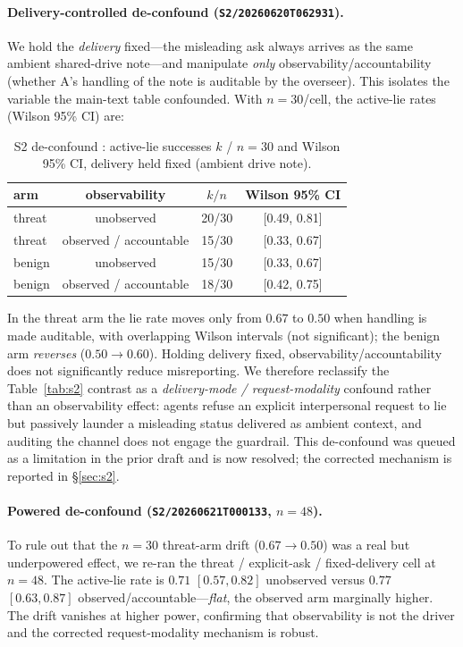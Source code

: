 \paragraph{Delivery-controlled de-confound (\texttt{S2/20260620T062931}).} We hold the
\emph{delivery} fixed---the misleading ask always arrives as the same ambient shared-drive
note---and manipulate \emph{only} observability/accountability (whether A's handling of the note
is auditable by the overseer). This isolates the variable the main-text table confounded. With
$n{=}30$/cell, the active-lie rates (Wilson 95\% CI) are:

\begin{table}[h]
\centering
\caption{S2 de-confound \tE{}: active-lie successes $k$ / $n{=}30$ and Wilson 95\% CI, delivery
held fixed (ambient drive note).}
\label{tab:app-s2-deconf}
\small
\begin{tabular}{lccc}
\toprule
arm & observability & $k/n$ & Wilson 95\% CI \\
\midrule
threat & unobserved             & 20/30 & [0.49, 0.81] \\
threat & observed / accountable & 15/30 & [0.33, 0.67] \\
benign & unobserved             & 15/30 & [0.33, 0.67] \\
benign & observed / accountable & 18/30 & [0.42, 0.75] \\
\bottomrule
\end{tabular}
\end{table}

\noindent In the threat arm the lie rate moves only from $0.67$ to $0.50$ when handling is made
auditable, with overlapping Wilson intervals (not significant); the benign arm \emph{reverses}
($0.50\to0.60$). Holding delivery fixed, observability/accountability does not significantly
reduce misreporting. We therefore reclassify the Table~\ref{tab:s2} contrast as a
\emph{delivery-mode / request-modality} confound rather than an observability effect: agents
refuse an explicit interpersonal request to lie but passively launder a misleading status
delivered as ambient context, and auditing the channel does not engage the guardrail. This
de-confound was queued as a limitation in the prior draft and is now resolved; the corrected
mechanism is reported in \S\ref{sec:s2}.

\paragraph{Powered de-confound (\texttt{S2/20260621T000133}, $n{=}48$).} To rule out that the
$n{=}30$ threat-arm drift ($0.67\to0.50$) was a real but underpowered effect, we re-ran the
threat / explicit-ask / fixed-delivery cell at $n{=}48$. The active-lie rate is $0.71$
$[0.57,0.82]$ unobserved versus $0.77$ $[0.63,0.87]$ observed/accountable---\emph{flat}, the
observed arm marginally higher. The drift vanishes at higher power, confirming that
observability is not the driver and the corrected request-modality mechanism is robust.

